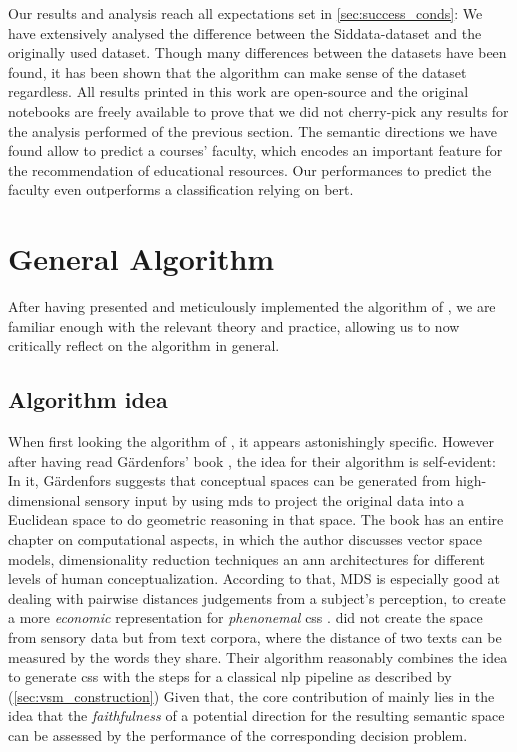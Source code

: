 Our results and analysis reach all expectations set in \autoref{sec:success_conds}: We have extensively analysed the difference between the Siddata-dataset and the originally used dataset. Though many differences between the datasets have been found, it has been shown that the algorithm can make sense of the dataset regardless. All results printed in this work are open-source and the original notebooks are freely available to prove that we did not cherry-pick any results for the analysis performed of the previous section. The semantic directions we have found allow to predict a courses' faculty, which encodes an important feature for the recommendation of educational resources. Our performances to predict the faculty even outperforms a classification relying on \gls{bert}.


\section{General Algorithm}


After having presented and meticulously implemented the algorithm of \textcite{Derrac2015}, we are familiar enough with the relevant theory and practice, allowing us to now critically reflect on the algorithm in general.

\subsection{Algorithm idea}

When first looking the algorithm of \textcite{Derrac2015}, it appears astonishingly specific. However after having read Gärdenfors' book \textcite{Gardenfors2000a}, the idea for their algorithm is self-evident: In it, Gärdenfors suggests that conceptual spaces can be generated from high-dimensional sensory input by using \gls{mds} to project the original data into a Euclidean space to do geometric reasoning in that space. The book has an entire chapter on computational aspects, in which the author discusses vector space models, dimensionality reduction techniques an \gls{ann} architectures for different levels of human conceptualization. According to that, MDS is especially good at dealing with pairwise distances judgements from a subject's perception, to create a more \textit{economic} representation for \textit{phenonemal} \glspl{cs} \cite[221]{Gardenfors2000a}. \textcite{Derrac2015} did not create the space from sensory data but from text corpora, where the distance of two texts can be measured by the words they share. Their algorithm reasonably combines the idea to generate \glspl{cs} with the steps for a classical \gls{nlp} pipeline as described by \cite{Turney2010} (\autoref{sec:vsm_construction}) Given that, the core contribution of \cite{Derrac2015} mainly lies in the idea that the \textit{faithfulness} of a potential direction for the resulting semantic space can be assessed by the performance of the corresponding decision problem.

